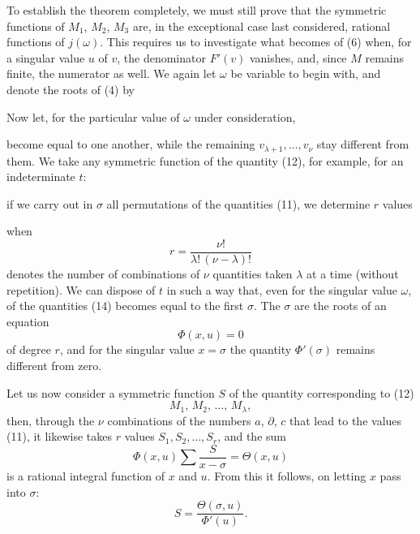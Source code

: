 
To establish the theorem completely, we must still prove that the symmetric functions of $M_1$, $M_2$, $M_3$ are, in
the exceptional case last considered, rational functions of
$j(\omega)$. This requires us to investigate what becomes of (6)
when, for a singular value $u$ of $v$, the denominator $F'(v)$ vanishes, and,
since $M$ remains finite, the numerator as well. We again let
$\omega$ be variable to begin with, and denote the roots of
(4) by

Now let, for the particular value of $\omega$ under consideration,

become equal to one another, while the remaining $v_{\lambda+1}, \ldots, v_\nu$ stay
different from them. We take any symmetric function of the quantity (12), for example, for an indeterminate $t$:

if we carry out in $\sigma$ all permutations of the quantities (11), we
determine $r$ values

when
\[
r = \frac{\nu!}{\lambda!\,(\nu - \lambda)!}
\]
denotes the number of combinations of $\nu$ quantities taken $\lambda$ at a time (without repetition). We can dispose of $t$ in such a way that, even for
the singular value $\omega$,  of the quantities (14) becomes equal to the
first $\sigma$. The $\sigma$ are the roots of an equation
\[
\Phi(x, u) = 0
\]
of degree $r$, and for the singular value $x = \sigma$ the quantity $\Phi'(\sigma)$
remains different from zero.

Let us now consider a symmetric function $S$ of the quantity
corresponding to (12)
\[
M_1,\, M_2,\, \ldots,\, M_\lambda,
\]
then, through the $\nu$ combinations of the numbers $a$, $\partial$, $c$ that
lead to the values (11), it likewise takes $r$ values $S_1, S_2, \ldots, S_r$,
and the sum
\[
\Phi(x, u) \sum \frac{S}{x - \sigma} = \Theta(x, u)
\]
is a rational integral function of $x$ and $u$. From this it follows,
on letting $x$ pass into $\sigma$:
\[
S = \frac{\Theta(\sigma, u)}{\Phi'(u)}.
\]

